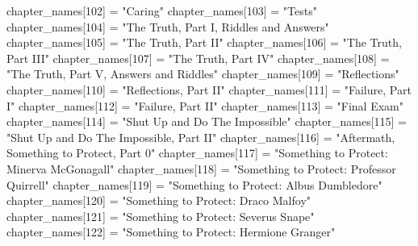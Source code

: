 {    chapter_names[102] = "Caring"
    chapter_names[103] = "Tests"
    chapter_names[104] = "The Truth, Part I, Riddles and Answers"
    chapter_names[105] = "The Truth, Part II"
    chapter_names[106] = "The Truth, Part III"
    chapter_names[107] = "The Truth, Part IV"
    chapter_names[108] = "The Truth, Part V, Answers and Riddles"
    chapter_names[109] = "Reflections"
    chapter_names[110] = "Reflections, Part II"
    chapter_names[111] = "Failure, Part I"
    chapter_names[112] = "Failure, Part II"
    chapter_names[113] = "Final Exam"
    chapter_names[114] = "Shut Up and Do The Impossible"
    chapter_names[115] = "Shut Up and Do The Impossible, Part II"
    chapter_names[116] = "Aftermath, Something to Protect, Part 0"
    chapter_names[117] = "Something to Protect: Minerva McGonagall"
    chapter_names[118] = "Something to Protect: Professor Quirrell"
    chapter_names[119] = "Something to Protect: Albus Dumbledore"
    chapter_names[120] = "Something to Protect: Draco Malfoy"
    chapter_names[121] = "Something to Protect: Severus Snape"
    chapter_names[122] = "Something to Protect: Hermione Granger"
}

\newcommand{\ChapterName}[1]{\directlua{tex.print(chapter_names[#1])}}

\newcommand{\ChapterNum}[1]{\directlua{%
    chapters = {\hpBookChapters}
    first_chap = chapters[1]
    extra = 0
    if \hpBookNo == 1 and #1 > 11 then
    extra = 1
    end
    tex.sprint(#1 - first_chap - extra + 1) -- add one because chapters start is inclusive
}}

